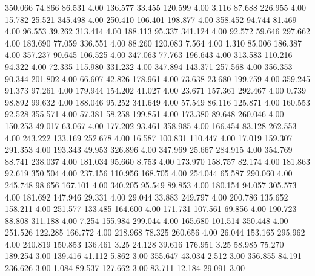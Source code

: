  350.066   74.866   86.531         4.00
 136.577   33.455  120.599         4.00
   3.116   87.688  226.955         4.00
  15.782   25.521  345.498         4.00
 250.410  106.401  198.877         4.00
 358.452   94.744   81.469         4.00
  96.553   39.262  313.414         4.00
 188.113   95.337  341.124         4.00
  92.572   59.646  297.662         4.00
 183.690   77.059  336.551         4.00
  88.260  120.083    7.564         4.00
   1.310   85.006  186.387         4.00
 357.237   90.645  106.525         4.00
 347.063   77.763  196.643         4.00
 313.583  110.216   94.322         4.00
  72.335  115.980  331.232         4.00
 347.894  143.371  257.568         4.00
 356.353   90.344  201.802         4.00
  66.607   42.826  178.961         4.00
  73.638   23.680  199.759         4.00
 359.245   91.373   97.261         4.00
 179.944  154.202   41.027         4.00
  23.671  157.361  292.467         4.00
   0.739   98.892   99.632         4.00
 188.046   95.252  341.649         4.00
  57.549   86.116  125.871         4.00
 160.553   92.528  355.571         4.00
  57.381   58.258  199.851         4.00
 173.380   89.648  260.046         4.00
 150.253   49.017   63.067         4.00
 177.202   93.461  358.985         4.00
 166.454   83.128  262.553         4.00
 243.222  133.169  252.678         4.00
  16.587  100.831  110.447         4.00
  17.019  159.307  291.353         4.00
 193.343   49.953  326.896         4.00
 347.969   25.667  284.915         4.00
 354.769   88.741  238.037         4.00
 181.034   95.660    8.753         4.00
 173.970  158.757   82.174         4.00
 181.863   92.619  350.504         4.00
 237.156  110.956  168.705         4.00
 254.044   65.587  290.060         4.00
 245.748   98.656  167.101         4.00
 340.205   95.549   89.853         4.00
 180.154   94.057  305.573         4.00
 181.692  147.946   29.331         4.00
  29.044   33.883  249.797         4.00
 200.786  135.652  158.211         4.00
 251.577  133.485  164.600         4.00
 171.731  107.561   69.856         4.00
 190.723   88.808  311.188         4.00
   7.254  155.984  299.044         4.00
 165.680  101.514  350.448         4.00
 251.526  122.285  166.772         4.00
 218.968   78.325  260.656         4.00
  26.044  153.165  295.962         4.00
 240.819  150.853  136.461         3.25
  24.128   39.616  176.951         3.25
  58.985   75.270  189.254         3.00
 139.416   41.112    5.862         3.00
 355.647   43.034    2.512         3.00
 356.855   84.191  236.626         3.00
   1.084   89.537  127.662         3.00
  83.711   12.184   29.091         3.00
